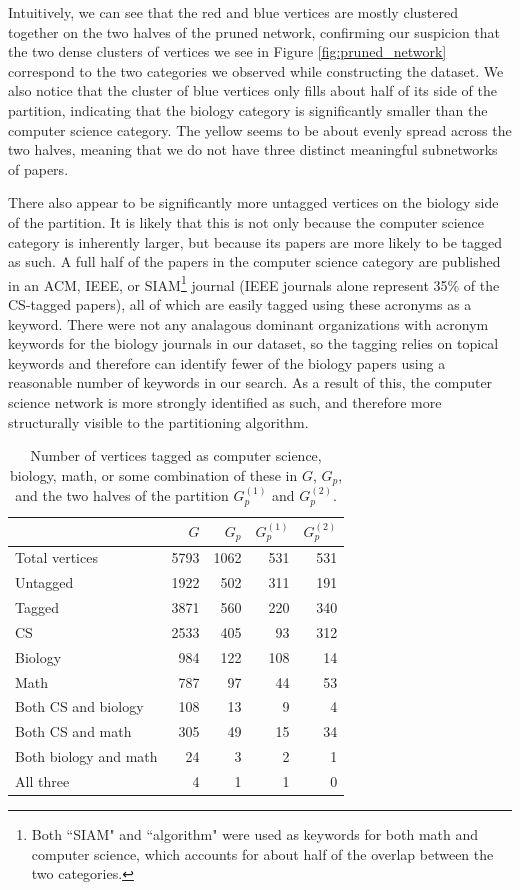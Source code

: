 \documentclass[12pt]{thesis}
\theoremstyle{plain}
\theoremstyle{definition}
\theoremstyle{remark}
\begin{document}
Intuitively, we can see that the red and blue vertices are mostly clustered together on the two halves of the pruned network, confirming our suspicion that the two dense clusters of vertices we see in Figure \ref{fig:pruned_network} correspond to the two categories we observed while constructing the dataset. We also notice that the cluster of blue vertices only fills about half of its side of the partition, indicating that the biology category is significantly smaller than the computer science category. The yellow seems to be about evenly spread across the two halves, meaning that we do not have three distinct meaningful subnetworks of papers. 

There also appear to be significantly more untagged vertices on the biology side of the partition. It is likely that this is not only because the computer science category is inherently larger, but because its papers are more likely to be tagged as such. A full half of the papers in the computer science category are published in an ACM, IEEE, or SIAM\footnote{Both ``SIAM" and ``algorithm" were used as keywords for both math and computer science, which accounts for about half of the overlap between the two categories.} journal (IEEE journals alone represent 35\% of the CS-tagged papers), all of which are easily tagged using these acronyms as a keyword. There were not any analagous dominant organizations with acronym keywords for the biology journals in our dataset, so the tagging relies on topical keywords and therefore can identify fewer of the biology papers using a reasonable number of keywords in our search. As a result of this, the computer science network is more strongly identified as such, and therefore more structurally visible to the partitioning algorithm.

\begin{table}[t]
\centering
\begin{tabular}{|l|r|r|r|r|}
\hline & $G$ & $G_p$ & $G_p^{(1)}$ & $G_p^{(2)}$ \\ \hline
Total vertices & 5793 & 1062 & 531 & 531 \\ \hline
Untagged & 1922 & 502 & 311 & 191 \\ \hline
Tagged & 3871 & 560 & 220 & 340 \\ \hline
CS & 2533 & 405 & 93 & 312 \\ \hline
Biology & 984 & 122 & 108 & 14 \\ \hline
Math & 787 & 97 & 44 & 53 \\ \hline
Both CS and biology & 108 & 13 & 9 & 4 \\ \hline
Both CS and math & 305 & 49 & 15 & 34 \\ \hline
Both biology and math & 24 & 3 & 2 & 1 \\ \hline
All three & 4 & 1 & 1 & 0 \\ \hline
\end{tabular}
\caption{Number of vertices tagged as computer science, biology, math, or some combination of these in $G$, $G_p$, and the two halves of the partition $G_p^{(1)}$ and $G_p^{(2)}$.}
\label{tab:subject_counts}
\end{table}
\end{document}
